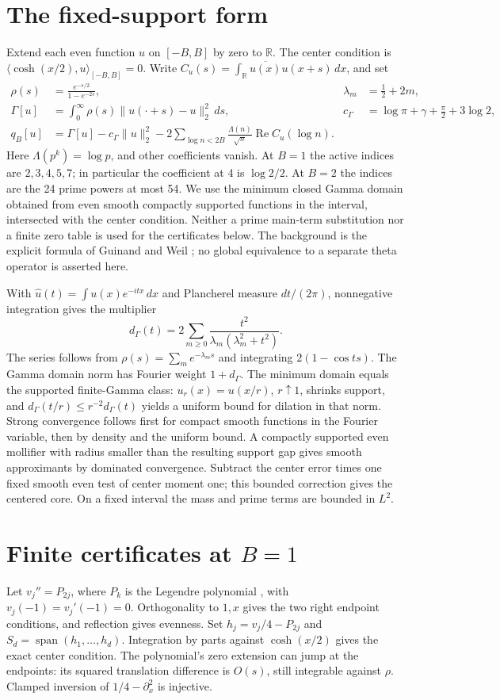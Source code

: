 \documentclass[11pt]{article}
\newcommand{\R}{\mathbb R}
\newcommand{\ip}[2]{\langle #1,#2\rangle}
\begin{document}
\section{The fixed-support form}
Extend each even function $u$ on $[-B,B]$ by zero to $\R$. The center condition is $\ip{\cosh(x/2)}u_{[-B,B]}=0$. Write $C_u(s)=\int_{\R}\overline{u(x)}u(x+s)\,dx$, and set
\begin{align*}
 \rho(s)&=\frac{e^{-s/2}}{1-e^{-2s}}, & \lambda_m&=\tfrac12+2m,\\
 \Gamma[u]&=\int_0^\infty\rho(s)\|u(\cdot+s)-u\|_2^2\,ds,
 & c_\Gamma&=\log\pi+\gamma+\frac\pi2+3\log2,\\
 q_B[u]&=\Gamma[u]-c_\Gamma\|u\|_2^2-
 2\!\sum_{\log n<2B}\frac{\Lambda(n)}{\sqrt n}\operatorname{Re} C_u(\log n).
\end{align*}
Here $\Lambda(p^k)=\log p$, and other coefficients vanish. At $B=1$ the active indices are $2,3,4,5,7$; in particular the coefficient at 4 is $\log2/2$. At $B=2$ the indices are the 24 prime powers at most 54. We use the minimum closed Gamma domain obtained from even smooth compactly supported functions in the interval, intersected with the center condition. Neither a prime main-term substitution nor a finite zero table is used for the certificates below. The background is the explicit formula of Guinand and Weil \cite{guinand,weil}; no global equivalence to a separate theta operator is asserted here.

With $\widehat u(t)=\int u(x)e^{-itx}\,dx$ and Plancherel measure $dt/(2\pi)$, nonnegative integration gives the multiplier
\[
 d_\Gamma(t)=2\sum_{m\ge0}\frac{t^2}{\lambda_m(\lambda_m^2+t^2)}.
\]
The series follows from $\rho(s)=\sum_m e^{-\lambda_ms}$ and integrating $2(1-\cos ts)$. The Gamma domain norm has Fourier weight $1+d_\Gamma$. The minimum domain equals the supported finite-Gamma class: $u_r(x)=u(x/r)$, $r\uparrow1$, shrinks support, and $d_\Gamma(t/r)\le r^{-2}d_\Gamma(t)$ yields a uniform bound for dilation in that norm. Strong convergence follows first for compact smooth functions in the Fourier variable, then by density and the uniform bound. A compactly supported even mollifier with radius smaller than the resulting support gap gives smooth approximants by dominated convergence. Subtract the center error times one fixed smooth even test of center moment one; this bounded correction gives the centered core. On a fixed interval the mass and prime terms are bounded in $L^2$.

\section[Finite certificates at B=1]{Finite certificates at $B=1$}\label{sec:finite}
Let $v_j''=P_{2j}$, where $P_k$ is the Legendre polynomial \cite{dlmflegendre}, with $v_j(-1)=v_j'(-1)=0$. Orthogonality to $1,x$ gives the two right endpoint conditions, and reflection gives evenness. Set $h_j=v_j/4-P_{2j}$ and $S_d=\operatorname{span}(h_1,\ldots,h_d)$. Integration by parts against $\cosh(x/2)$ gives the exact center condition. The polynomial's zero extension can jump at the endpoints: its squared translation difference is $O(s)$, still integrable against $\rho$. Clamped inversion of $1/4-\partial_x^2$ is injective.
\end{document}
